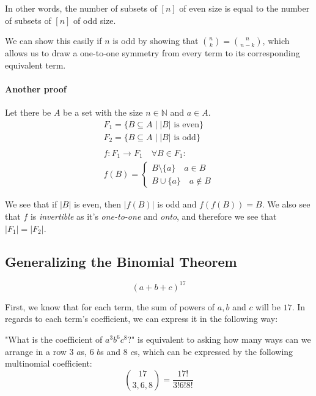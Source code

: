 \documentclass[00_complete]{subfiles}
\begin{document}
\begin{conclusion}
In other words, the number of subsets of $[n]$ of even size is equal to the
number of subsets of $[n]$ of odd size.

We can show this easily if $n$ is odd by showing that $\binom{n}{k} = \binom{n}{n-k}$, which
allows us to draw a one-to-one symmetry from every term to its corresponding
equivalent term.
\end{conclusion}

\paragraph{Another proof}

Let there be $A$ be a set with the size $n \in \mathbb{N}$ and $a \in A$.
\begin{gather*}
    F_1=\{ B \subseteq A \mid |B| \text{ is even}\} \\
    F_2=\{ B \subseteq A \mid |B| \text{ is odd}\} \\
    \\
    f: F_1 \to F_1 \quad \forall B \in F_1: \\
    f(B)=\begin{cases}
        B \setminus \{a\} \quad a \in B \\
        B \cup \{a\} \quad a \notin B
    \end{cases}
\end{gather*}

We see that if $|B|$ is even, then $|f(B)|$ is odd and $f(f(B))=B$. We also see
that $f$ is \emph{invertible} as it's \emph{one-to-one} and \emph{onto}, and therefore we see
that $|F_1|=|F_2|$.

\subsection{Generalizing the Binomial Theorem}

\begin{example}
$$(a+b+c)^{17}$$

First, we know that for each term, the sum of powers of $a,b$ and $c$ will be
$17$. In regards to each term's coefficient, we can express it in the following
way:

"What is the coefficient of $a^3b^6c^8$?" is equivalent to asking how many ways
can we arrange in a row  3 $a$s, 6 $b$s and 8 $c$s, which can be expressed by
the following multinomial coefficient:
$$\binom{17}{3,6,8} = \frac{17!}{3!6!8!}$$
\end{example}
\end{document}

